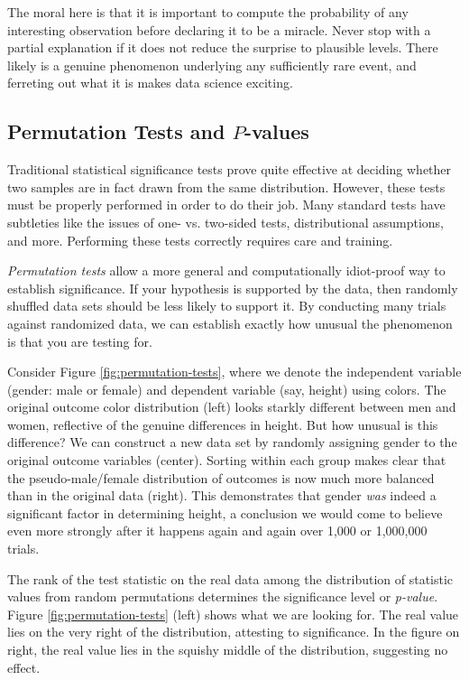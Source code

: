 \documentclass[10pt]{article}
\begin{document}
The moral here is that it is important to compute the probability of any interesting observation before declaring it to be a miracle. Never stop with a partial explanation if it does not reduce the surprise to plausible levels. There likely is a genuine phenomenon underlying any sufficiently rare event, and ferreting out what it is makes data science exciting.

\subsection{Permutation Tests and $P$-values}

Traditional statistical significance tests prove quite effective at deciding whether two samples are in fact drawn from the same distribution. However, these tests must be properly performed in order to do their job. Many standard tests have subtleties like the issues of one- vs. two-sided tests, distributional assumptions, and more. Performing these tests correctly requires care and training.

\textit{Permutation tests} allow a more general and computationally idiot-proof way to establish significance. If your hypothesis is supported by the data, then randomly shuffled data sets should be less likely to support it. By conducting many trials against randomized data, we can establish exactly how unusual the phenomenon is that you are testing for.

Consider Figure \ref{fig:permutation-tests}, where we denote the independent variable (gender: male or female) and dependent variable (say, height) using colors. The original outcome color distribution (left) looks starkly different between men and women, reflective of the genuine differences in height. But how unusual is this difference? We can construct a new data set by randomly assigning gender to the original outcome variables (center). Sorting within each group makes clear that the pseudo-male/female distribution of outcomes is now much more balanced than in the original data (right). This demonstrates that gender \textit{was} indeed a significant factor in determining height, a conclusion we would come to believe even more strongly after it happens again and again over 1,000 or 1,000,000 trials.

The rank of the test statistic on the real data among the distribution of statistic values from random permutations determines the significance level or \textit{p-value}. Figure \ref{fig:permutation-tests} (left) shows what we are looking for. The real value lies on the very right of the distribution, attesting to significance. In the figure on right, the real value lies in the squishy middle of the distribution, suggesting no effect.
\end{document}
